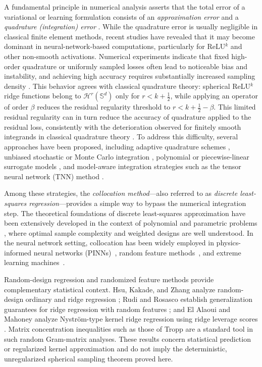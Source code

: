 \documentclass{article}
\numberwithin{equation}{section}
\begin{document}
A fundamental principle in numerical analysis asserts that the total error of a variational or learning formulation consists of an \emph{approximation error} and a \emph{quadrature (integration) error} \cite{strang1972variational,brenner2008mathematical}. 
While the quadrature error is usually negligible in classical finite element methods, recent studies have revealed that it may become dominant in neural-network-based computations, particularly for ReLU$^k$ and other non-smooth activations. 
Numerical experiments indicate that fixed high-order quadrature or uniformly sampled losses often lead to noticeable bias and instability, and achieving high accuracy requires substantially increased sampling density \cite{rivera2022quadrature,liao2023deep,magueresse2023adaptive,taylor2025stochastic}. 
This behavior agrees with classical quadrature theory: spherical ReLU$^k$ ridge functions belong to $\mathcal H^r(\mathbb S^d)$ only for $r<k+\tfrac12$, while applying an operator of order $\beta$ reduces the residual regularity threshold to $r<k+\tfrac12-\beta$. This limited residual regularity can in turn reduce the accuracy of quadrature applied to the residual loss, consistently with the deterioration observed for finitely smooth integrands in classical quadrature theory \cite{gauss1814methodus,davis1984methods}. 
To address this difficulty, several approaches have been proposed, including adaptive quadrature schemes \cite{magueresse2023adaptive}, unbiased stochastic or Monte Carlo integration \cite{rivera2022quadrature,taylor2025stochastic}, polynomial or piecewise-linear surrogate models \cite{rivera2022quadrature}, and model-aware integration strategies such as the tensor neural network (TNN) method \cite{wang2023tnn}. 

Among these strategies, the \emph{collocation method}---also referred to as \emph{discrete least-squares regression}---provides a simple way to bypass the numerical integration step. The theoretical foundations of discrete least-squares approximation have been extensively developed in the context of polynomial and parametric problems \cite{cohen2017optimal,chkifa2015discrete}, where optimal sample complexity and weighted designs are well understood. In the neural network setting, collocation has been widely employed in physics-informed neural networks (PINNs)~\cite{raissi2019physics}, random feature methods~\cite{chen2022bridging}, and extreme learning machines~\cite{HZS:2006,wang2024extreme}.

 
Random-design regression and randomized feature methods provide complementary
statistical context. Hsu, Kakade, and Zhang analyze random-design ordinary
and ridge regression \cite{hsu2014random}; Rudi and Rosasco establish
generalization guarantees for ridge regression with random features
\cite{rudi2017generalization}; and El Alaoui and Mahoney analyze
Nystr\"om-type kernel ridge regression using ridge leverage scores
\cite{alaoui2015fast}. Matrix concentration inequalities such as those of
Tropp \cite{tropp2012user} are a standard tool in such random Gram-matrix
analyses. These results concern statistical prediction or regularized kernel
approximation and do not imply the deterministic, unregularized spherical
sampling theorem proved here.
 
\end{document}
